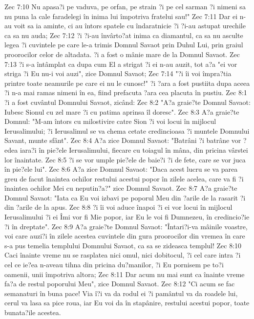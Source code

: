 Zec 7:10  Nu apasa?i pe vaduva, pe orfan, pe strain ?i pe cel sarman ?i nimeni sa nu puna la cale faradelegi în inima lui împotriva fratelui sau!"
Zec 7:11  Dar ei n-au voit sa ia aminte, ci au întors spatele cu îndaratnicie ?i ?i-au astupat urechile ca sa nu auda;
Zec 7:12  ?i ?i-au învârto?at inima ca diamantul, ca sa nu asculte legea ?i cuvintele pe care le-a trimis Domnul Savaot prin Duhul Lui, prin graiul proorocilor celor de altadata. ?i a fost o mânie mare de la Domnul Savaot.
Zec 7:13  ?i s-a întâmplat ca dupa cum El a strigat ?i ei n-au auzit, tot a?a "ei vor striga ?i Eu nu-i voi auzi", zice Domnul Savaot;
Zec 7:14  "?i îi voi împra?tia printre toate neamurile pe care ei nu le cunosc!" ?i ?ara a fost pustiita dupa aceea ?i n-a mai ramas nimeni în ea, fiind prefacuta ?ara cea placuta în pustiu.
Zec 8:1  ?i a fost cuvântul Domnului Savaot, zicând:
Zec 8:2  "A?a graie?te Domnul Savaot: Iubesc Sionul cu zel mare ?i cu patima aprinsa îl doresc".
Zec 8:3  A?a graie?te Domnul: "M-am întors cu milostivire catre Sion ?i voi locui în mijlocul Ierusalimului; ?i Ierusalimul se va chema cetate credincioasa ?i muntele Domnului Savant, munte sfânt".
Zec 8:4  A?a zice Domnul Savaot: "Batrâni ?i batrâne vor ?edea iara?i în pie?ele Ierusalimului, fiecare cu toiagul în mâna, din pricina vârstei lor înaintate.
Zec 8:5  ?i se vor umple pie?ele de baie?i ?i de fete, care se vor juca în pie?ele lui".
Zec 8:6  A?a zice Domnul Savaot: "Daca acest lucru se va parea greu de facut înaintea ochilor restului acestui popor în zilele acelea, care va fi ?i înaintea ochilor Mei cu neputin?a?" zice Domnul Savaot.
Zec 8:7  A?a graie?te Domnul Savaot: "Iata ca Eu voi izbavi pe poporul Meu din ?arile de la rasarit ?i din ?arile de la apus.
Zec 8:8  ?i îi voi aduce înapoi ?i ei vor locui în mijlocul Ierusalimului ?i ei Îmi vor fi Mie popor, iar Eu le voi fi Dumnezeu, în credincio?ie ?i în dreptate".
Zec 8:9  A?a graie?te Domnul Savaot: "Întari?i-va mâinile voastre, voi care auzi?i în zilele acestea cuvintele din gura proorocilor din vremea în care s-a pus temelia templului Domnului Savaot, ca sa se zideasca templul!
Zec 8:10  Caci înainte vreme nu se rasplatea nici omul, nici dobitocul, ?i cel care intra ?i cel ce ie?ea n-aveau tihna din pricina du?manilor, ?i Eu pornisem pe to?i oamenii, unii împotriva altora;
Zec 8:11  Dar acum nu mai sunt ca înainte vreme fa?a de restul poporului Meu", zice Domnul Savaot.
Zec 8:12  "Ci acum se fac semanaturi în buna pace! Via î?i va da rodul ei ?i pamântul va da roadele lui, cerul va lasa sa pice roua, iar Eu voi da în stapânire, restului acestui popor, toate bunata?ile acestea.
